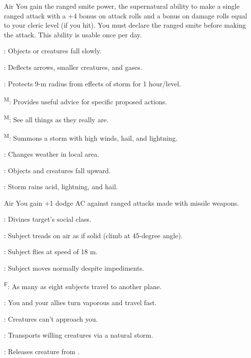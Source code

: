 {Air}
{You gain the ranged smite power, the supernatural ability to make a single ranged attack with a +4 bonus on attack rolls and a bonus on damage rolls equal to your cleric level (if you hit). You must declare the ranged smite before making the attack. This ability is usable once per day.}
{
	\item {}: Objects or creatures fall slowly.
	\item {}: Deflects arrows, smaller creatures, and gases.
	\item {}: Protects 9-m radius from effects of storm for 1 hour/level.
	\item {}\textsuperscript{M}: Provides useful advice for specific proposed actions.
	\item {}\textsuperscript{M}: See all things as they really are.
	\item {}\textsuperscript{M}: Summons a storm with high winds, hail, and lightning.
	\item {}: Changes weather in local area.
	\item {}: Objects and creatures fall upward.
	\item {}: Storm rains acid, lightning, and hail.
}

{Air}
{You gain +1 dodge AC against ranged attacks made with missile weapons.}
{
	\item {}: Divines target's social class.
	\item {}: Subject treads on air as if solid (climb at 45-degree angle). 
	\item {}: Subject flies at speed of 18 m.
	\item {}: Subject moves normally despite impediments.
	\item {}\textsuperscript{F}: As many as eight subjects travel to another plane.
	\item {}: You and your allies turn vaporous and travel fast.
	\item {}: Creatures can't approach you.
	\item {}: Transports willing creatures via a natural storm.
	\item {}: Releases creature from .
}

